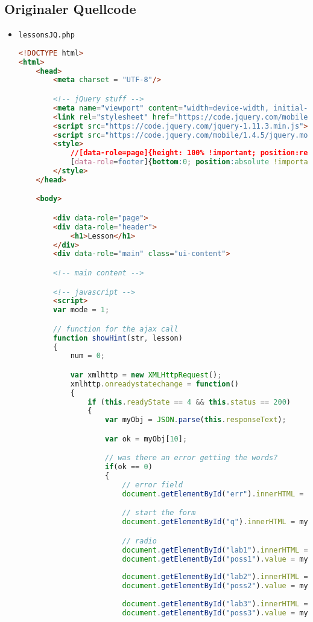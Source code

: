 \documentclass{scrartcl}
\begin{document}
\subsection{Originaler Quellcode}
\begin{itemize}
\item \lstinline`lessonsJQ.php`
\begin{lstlisting}[language=html]
<!DOCTYPE html>
<html>
	<head>
		<meta charset = "UTF-8"/>

		<!-- jQuery stuff -->
		<meta name="viewport" content="width=device-width, initial-scale=1">
		<link rel="stylesheet" href="https://code.jquery.com/mobile/1.4.5/jquery.mobile-1.4.5.min.css">
		<script src="https://code.jquery.com/jquery-1.11.3.min.js"></script>
		<script src="https://code.jquery.com/mobile/1.4.5/jquery.mobile-1.4.5.min.js"></script>
		<style>
			//[data-role=page]{height: 100% !important; position:relative !important;}
			[data-role=footer]{bottom:0; position:absolute !important; top: auto !important; width:100%;}
		</style>
	</head>

	<body>	

		<div data-role="page">
		<div data-role="header">
			<h1>Lesson</h1>
		</div>
		<div data-role="main" class="ui-content">

		<!-- main content -->

		<!-- javascript -->
		<script>
		var mode = 1;

		// function for the ajax call
		function showHint(str, lesson) 
		{
			num = 0;

			var xmlhttp = new XMLHttpRequest();
			xmlhttp.onreadystatechange = function()
			{
				if (this.readyState == 4 && this.status == 200)
				{
					var myObj = JSON.parse(this.responseText);

					var ok = myObj[10];

					// was there an error getting the words?
					if(ok == 0)
					{
						// error field
						document.getElementById("err").innerHTML = "";		

						// start the form
						document.getElementById("q").innerHTML = myObj[0];

						// radio
						document.getElementById("lab1").innerHTML = myObj[1];
						document.getElementById("poss1").value = myObj[1];
	
						document.getElementById("lab2").innerHTML = myObj[2];
						document.getElementById("poss2").value = myObj[2];
	
						document.getElementById("lab3").innerHTML = myObj[3];
						document.getElementById("poss3").value = myObj[3];
	

\end{lstlisting}
\end{itemize}
\end{document}
